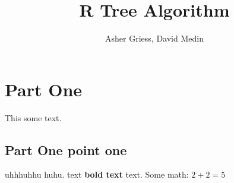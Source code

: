 \documentclass{article}
\author{Asher Griess, David Medin}
\title{R Tree Algorithm}
\begin{document}
\maketitle

\section{Part One}
This some text.
\subsection*{Part One point one}
uhhhuhhu huhu.
text \textbf{bold text} text. Some math: $2+2=5$

\end{document}
